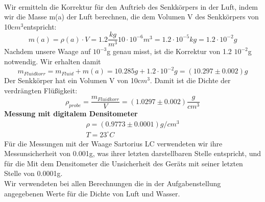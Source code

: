 \documentclass{article}
\begin{document}
 \\
Wir ermitteln die Korrektur für den Auftrieb des Senkkörpers in der Luft, indem wir die Masse m(a) der Luft berechnen, die dem Volumen V des Senkkörpers von 10c$m^3$entspricht:
\begin{equation}
m(a)=\rho(a) \cdot V=1.2\frac{kg}{m^3}10\cdot10^{-6}m^3=1.2\cdot 10^{-5}kg=1.2\cdot  10^{-2}g
\end{equation}
Nachdem unsere Waage auf $10^{-3}$g genau misst, ist die Korrektur von 1.2 $10^{-2}$g notwendig. Wir erhalten damit
\begin{equation}
m_{Fluid korr}=m_{Fluid}+m(a)=10.285g+1.2\cdot  10^{-2}g=(10.297 \pm 0.002)g 
\end{equation} 
Der Senkkörper hat ein Volumen V von 10c$m^3$. Damit ist die Dichte der verdrängten Flüßigkeit:
\begin{equation}
\rho_{probe}=\frac{m_{Fluid korr}}{V}=(1.0297 \pm 0.002) \frac{g}{cm^3}
\end{equation}
\textbf{Messung mit digitalem Densitometer}
\begin{gather*}
\rho=(0.9773 \pm 0.0001 )g/cm^3 \\
T=23^{\circ}C
\end{gather*}
Für die Messungen mit der Waage Sartorius LC verwendeten wir ihre Messunsicherheit von 0.001g, was ihrer letzten darstellbaren Stelle entspricht, und für die Mit dem Densitometer die Unsicherheit des Geräts mit seiner letzten Stelle von 0.0001g. \\
Wir verwendeten bei allen Berechnungen die in der Aufgabenstellung angegebenen Werte für die Dichte von Luft und Wasser.

\end{document}

